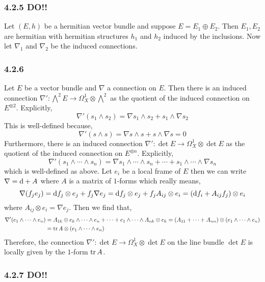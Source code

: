 \documentclass[12pt]{article}
\begin{document}
\subsubsection{4.2.5 DO!!}

Let $(E, h)$ be a hermitian vector bundle and suppose $E = E_1 \oplus E_2$. Then $E_1, E_2$ are hermitian with hermitian structures $h_1$ and $h_2$ induced by the inclusions. Now let $\nabla_1$ and $\nabla_2$ be the induced connections.

\subsubsection{4.2.6}

Let $E$ be a vector bundle and $\nabla$ a connection on $E$. Then there is an induced connection $\nabla' : \bigwedge^2 E \to \Omega^1_X \otimes \bigwedge^2$ as the quotient of the induced connection on $E^{\otimes 2}$. Explicitly,
\[ \nabla' (s_1 \wedge s_2) = \nabla s_1 \wedge s_2 + s_1 \wedge \nabla s_2 \]
This is well-defined because,
\[ \nabla' (s \wedge s) = \nabla s \wedge s + s \wedge \nabla s = 0 \]
Furthermore, there is an induced connection $\nabla' : \det{E} \to \Omega^1_X \otimes \det{E}$ as the quotient of the induced connection on $E^{\otimes n}$. Explicitly,
\[ \nabla' (s_1 \wedge \cdots \wedge s_n) = \nabla s_1 \wedge \cdots \wedge s_n + \cdots + s_1 \wedge \cdots \wedge \nabla s_n \]
which is well-defined as above. Let $e_i$ be a local frame of $E$ then we can write $\nabla = \mathrm{d} + A$ where $A$ is a matrix of $1$-forms which really means,
\[ \nabla(f_j e_j) = \mathrm{d}{f_j} \otimes e_j + f_j \nabla e_j = \mathrm{d}{f_j} \otimes e_j + f_j A_{ij} \otimes e_i = (\mathrm{d}{f}_i + A_{ij} f_j) \otimes e_i \]
where $A_{ij} \otimes e_i = \nabla e_j$. Then we find that,
\begin{align*}
\nabla' (e_1 \wedge \cdots \wedge e_n) & = A_{1k} \otimes e_k \wedge \cdots \wedge e_n + \cdots + e_1 \wedge \cdots \wedge A_{nk} \otimes e_k = (A_{11} + \cdots + A_{nn}) \otimes (e_1 \wedge \cdots \wedge e_n) 
\\
& = \operatorname{\mathrm{tr}}{A} \otimes (e_1 \wedge \cdots \wedge e_n) 
\end{align*}
Therefore, the connection $\nabla' : \det{E} \to \Omega^1_X \otimes \det{E}$ on the line bundle $\det{E}$ is locally given by the $1$-form $\operatorname{\mathrm{tr}}{A}$.

\subsubsection{4.2.7 DO!!}
\end{document}
